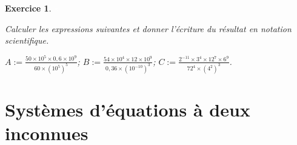 \documentclass [10pt,a4paper] {article}
\newtheorem{exo}{Exercice}
\begin{document}
\vspace{0.25cm}

\begin{exo}%
\textcolor{white}{s}

Calculer les expressions suivantes et donner l'écriture 
 du résultat en notation scientifique.\\
 
 \begin{center}
$A:=${\Large $ \frac{50\times 10^{5}\times 0,6 \times 10^{9}}{60 \times {(10^{5})}^{5}}$; } \hspace{0.25cm} $B:=${\Large $ \frac{54\times 10^{4}\times 12 \times 10^{9}}{0,36 \times {(10^{-10})}^{3}}$;} \hspace{0.25cm}  $C:=${\Large $\frac{2^{-11}\times 3^{4}\times 12^{7} \times 6^{9}}{72^{4} \times {(4^{2})}^{3}}$.}
\end{center}



%
%

\end{exo}



\vspace{0.25cm}



\section{Systèmes d'équations à deux inconnues}
\end{document}

